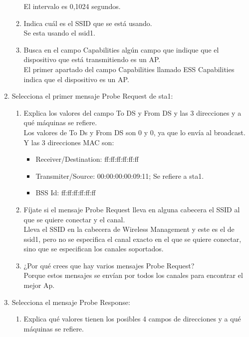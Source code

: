 \documentclass[12pt, a4paper]{report}
\begin{document}
\begin{enumerate}
\begin{enumerate}[label=\alph*)]
		El intervalo es 0,1024 segundos.
		\item Indica cuál es el SSID que se está usando.\\
		
		Se esta usando el ssid1.
		\item Busca en el campo Capabilities algún campo que indique que el dispositivo que está
		transmitiendo es un AP.\\
		
		El primer apartado del campo Capabilities llamado ESS Capabilities indica que el dispositivo es un AP.
	\end{enumerate}
	\item Selecciona el primer mensaje Probe Request de sta1:
	\begin{enumerate}[label=\alph*)]
		\item Explica los valores del campo To DS y From DS y las 3 direcciones y a qué máquinas se
		refiere.\\
		
		Los valores de To Ds y From DS son 0 y 0, ya que lo envía al broadcast. Y las 3 direcciones MAC son:
		\begin{itemize}
			\item Receiver/Destination: ff:ff:ff:ff:ff:ff\\
			\item Transmiter/Source: 00:00:00:00:09:11; Se refiere a sta1.\\
			\item BSS Id: ff:ff:ff:ff:ff:ff \\
		\end{itemize}
		\item Fíjate si el mensaje Probe Request lleva en alguna cabecera el SSID al que se quiere conectar
		y el canal.\\
		
		Lleva el SSID en la cabecera de Wireless Management y este es el de ssid1, pero no se especifica el canal exacto en el que se quiere conectar, sino que se especifican los canales soportados.
		\item ¿Por qué crees que hay varios mensajes Probe Request?\\
		
		Porque estos mensajes se envían por todos los canales para encontrar el mejor Ap.
	\end{enumerate}
	\item Selecciona el mensaje Probe Response:
	\begin{enumerate}[label=\alph*)]
		\item Explica qué valores tienen los posibles 4 campos de direcciones y a qué máquinas se refiere.\\
		

\end{enumerate}
\end{enumerate}
\end{document}
